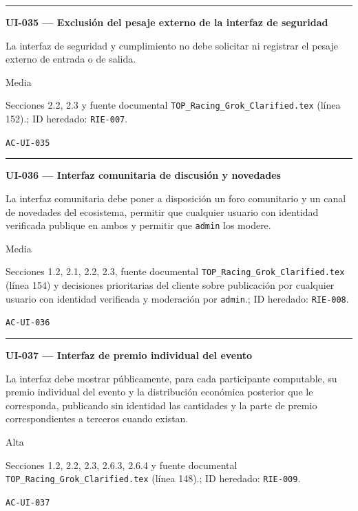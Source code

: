 \documentclass[10pt,letterpaper]{article}
\begin{document}
\vspace{0.25em}\hrule\vspace{0.65em}
\noindent\textbf{UI-035 --- Exclusión del pesaje externo de la interfaz de seguridad}\par
\begin{description}[style=nextline,leftmargin=3.15cm,labelwidth=2.8cm,font=\normalfont\bfseries]
\item[Obligación] La interfaz de seguridad y cumplimiento no debe solicitar ni registrar el pesaje externo de entrada o de salida.
\item[Prioridad] Media
\item[Procedencia] Secciones 2.2, 2.3 y fuente documental \texttt{TOP\_Racing\_Grok\_Clarified.tex} (línea 152).; ID heredado: \texttt{RIE-007}.
\item[Verificación] \texttt{AC-UI-035}
\end{description}
\vspace{0.25em}\hrule\vspace{0.65em}
\noindent\textbf{UI-036 --- Interfaz comunitaria de discusión y novedades}\par
\begin{description}[style=nextline,leftmargin=3.15cm,labelwidth=2.8cm,font=\normalfont\bfseries]
\item[Obligación] La interfaz comunitaria debe poner a disposición un foro comunitario y un canal de novedades del ecosistema, permitir que cualquier usuario con identidad verificada publique en ambos y permitir que \texttt{admin} los modere.
\item[Prioridad] Media
\item[Procedencia] Secciones 1.2, 2.1, 2.2, 2.3, fuente documental \texttt{TOP\_Racing\_Grok\_Clarified.tex} (línea 154) y decisiones prioritarias del cliente sobre publicación por cualquier usuario con identidad verificada y moderación por \texttt{admin}.; ID heredado: \texttt{RIE-008}.
\item[Verificación] \texttt{AC-UI-036}
\end{description}
\vspace{0.25em}\hrule\vspace{0.65em}
\noindent\textbf{UI-037 --- Interfaz de premio individual del evento}\par
\begin{description}[style=nextline,leftmargin=3.15cm,labelwidth=2.8cm,font=\normalfont\bfseries]
\item[Obligación] La interfaz debe mostrar públicamente, para cada participante computable, su premio individual del evento y la distribución económica posterior que le corresponda, publicando sin identidad las cantidades y la parte de premio correspondientes a terceros cuando existan.
\item[Prioridad] Alta
\item[Procedencia] Secciones 1.2, 2.2, 2.3, 2.6.3, 2.6.4 y fuente documental \texttt{TOP\_Racing\_Grok\_Clarified.tex} (línea 148).; ID heredado: \texttt{RIE-009}.
\item[Verificación] \texttt{AC-UI-037}
\end{description}
\end{document}
